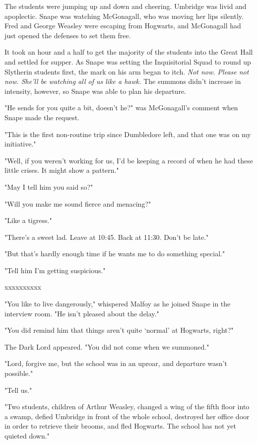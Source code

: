 \documentclass[a4paper,11pt]{article}
\begin{document}
The students were jumping up and down and cheering. Umbridge was livid and apoplectic. Snape was watching McGonagall, who was moving her lips silently. Fred and George Weasley were escaping from Hogwarts, and McGonagall had just opened the defenses to set them free.

It took an hour and a half to get the majority of the students into the Great Hall and settled for supper. As Snape was setting the Inquisitorial Squad to round up Slytherin students first, the mark on his arm began to itch. \emph{Not now. Please not now. She'll be watching all of us like a hawk.} The summons didn't increase in intensity, however, so Snape was able to plan his departure.

"He sends for you quite a bit, doesn't he?" was McGonagall's comment when Snape made the request.

"This is the first non-routine trip since Dumbledore left, and that one was on my initiative."

"Well, if you weren't working for us, I'd be keeping a record of when he had these little crises. It might show a pattern."

"May I tell him you said so?"

"Will you make me sound fierce and menacing?"

"Like a tigress."

"There's a sweet lad. Leave at 10:45. Back at 11:30. Don't be late."

"But that's hardly enough time if he wants me to do something special."

"Tell him I'm getting suspicious."

xxxxxxxxxx

"You like to live dangerously," whispered Malfoy as he joined Snape in the interview room. "He isn't pleased about the delay."

"You did remind him that things aren't quite `normal' at Hogwarts, right?"

The Dark Lord appeared. "You did not come when we summoned."

"Lord, forgive me, but the school was in an uproar, and departure wasn't possible."

"Tell us."

"Two students, children of Arthur Weasley, changed a wing of the fifth floor into a swamp, defied Umbridge in front of the whole school, destroyed her office door in order to retrieve their brooms, and fled Hogwarts. The school has not yet quieted down."
\end{document}
